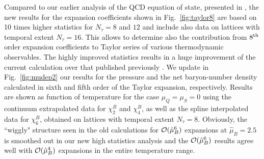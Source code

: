 \documentclass[pdflatex,prd,twocolumn,showpacs,superscriptaddress,nofootinbib]{revtex4-1}
\newcommand \hmu {\hat{\mu}}
\begin{document}
Compared to our earlier analysis of the QCD equation of 
state, presented in \cite{Bazavov:2017dus}, the new results 
for the expansion coefficients shown in Fig.~\ref{fig:taylor8}  
are based
on 10 times higher statistics for $N_\tau =8$ and $12$
and include also data on lattices with temporal extent
$N_\tau =16$. This allows to determine also
the contribution from $8^{\rm th}$ order expansion
coefficients to Taylor series of various thermodynamic observables. The highly improved statistics results in a huge improvement of the current calculation over that published 
previously \cite{Bazavov:2017dus}. 
We update in Fig.~\ref{fig:mudep2} our results for the pressure 
and the net
baryon-number density calculated in sixth and fifth order of the Taylor expansion, respectively. Results are shown as function of temperature for the case $\mu_Q=\mu_S=0$ using the 
continuum extrapolated data for $\chi_2^B$ and $\chi_4^B$,
as well as the spline interpolated data for $\chi_6^B$, obtained 
on lattices with temporal extent $N_\tau=8$.
Obviously, the ``wiggly" structure seen in
the old calculations for ${\cal O}(\hmu_B^6)$ expansions at $\hmu_B=2.5$ \cite{Bazavov:2017dus} is smoothed out in our new 
high statistics analysis and the ${\cal O}(\hmu_B^6)$ results 
agree well with ${\cal O}(\hmu_B^4)$ expansions in the entire temperature range.
\end{document}
